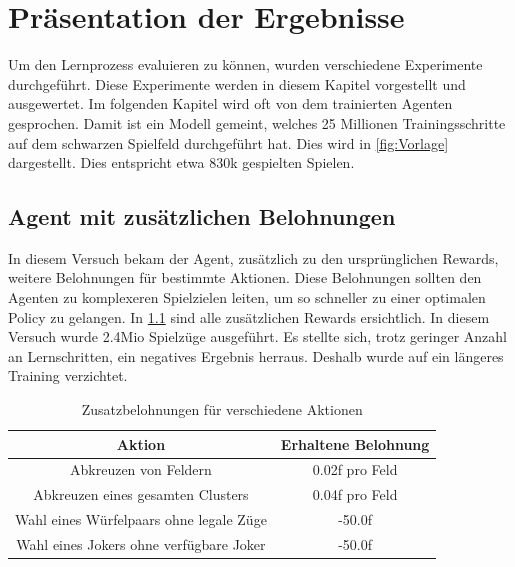 

\clearpage
\chapter{Präsentation der Ergebnisse}

Um den Lernprozess evaluieren zu können, wurden verschiedene Experimente durchgeführt. Diese Experimente werden in diesem Kapitel vorgestellt und ausgewertet. 
Im folgenden Kapitel wird oft von dem trainierten Agenten gesprochen. Damit ist ein Modell gemeint, welches 25 Millionen Trainingsschritte auf dem schwarzen Spielfeld durchgeführt hat. Dies wird in \ref{fig:Vorlage} dargestellt. Dies entspricht etwa 830k gespielten Spielen.

\newpage
\section{Agent mit zusätzlichen Belohnungen}
In diesem Versuch bekam der Agent, zusätzlich zu den ursprünglichen Rewards, weitere Belohnungen für bestimmte Aktionen. Diese Belohnungen sollten den Agenten zu komplexeren Spielzielen leiten, um so schneller zu einer optimalen Policy zu gelangen.
In \ref{tab:rewards2} sind alle zusätzlichen Rewards ersichtlich. In diesem Versuch wurde 2.4Mio Spielzüge ausgeführt. Es stellte sich, trotz geringer Anzahl an Lernschritten, ein negatives Ergebnis herraus. Deshalb wurde auf ein längeres Training verzichtet.  

\begin{table}[!h]
    \centering
    \begin{tabular}{|c|c|}
    \hline
    \textbf{Aktion} & \textbf{Erhaltene Belohnung} \\
    \hline
    Abkreuzen von Feldern & 0.02f pro Feld \\
    \hline
    Abkreuzen eines gesamten Clusters & 0.04f pro Feld \\
    \hline
    Wahl eines Würfelpaars ohne legale Züge & -50.0f \\
    \hline
    Wahl eines Jokers ohne verfügbare Joker & -50.0f \\
    \hline
    \end{tabular}
    \caption{Zusatzbelohnungen für verschiedene Aktionen}
    \label{tab:rewards2}
\end{table}



